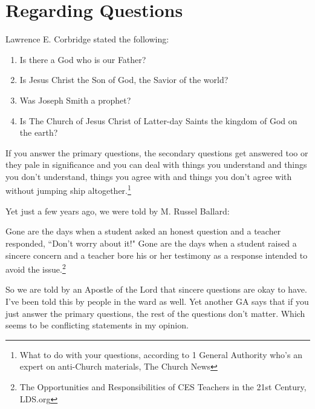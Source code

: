 \chapter{Regarding Questions}

Lawrence E. Corbridge stated the following:

\begin{displayquote}
\begin{enumerate}
\item Is there a God who is our Father?
\item Is Jesus Christ the Son of God, the Savior of the world?
\item Was Joseph Smith a prophet?
\item Is The Church of Jesus Christ of Latter-day Saints the kingdom of God on the 
earth?
\end{enumerate}

If you answer the primary questions, the secondary questions get answered too or they 
pale in significance and you can deal with things you understand and things you don’t 
understand, things you agree with and things you don’t agree with without jumping 
ship altogether.\footnote{What to do with your questions, according to 1 General 
Authority who's an expert on anti-Church materials, The Church News}
\end{displayquote}

Yet just a few years ago, we were told by M. Russel Ballard:

\begin{displayquote}

Gone are the days when a student asked an honest question and a teacher responded, 
``Don’t worry about it!" Gone are the days when a student raised a sincere concern 
and a teacher bore his or her testimony as a response intended to avoid the 
issue.\footnote{The Opportunities and Responsibilities of CES Teachers in the 21st 
Century, LDS.org}
\end{displayquote}

So we are told by an Apostle of the Lord that sincere questions are okay to have.
I've been told this by people in the ward as well. Yet another GA says that if you
just answer the primary questions, the rest of the questions don't matter. Which
seems to be conflicting statements in my opinion.